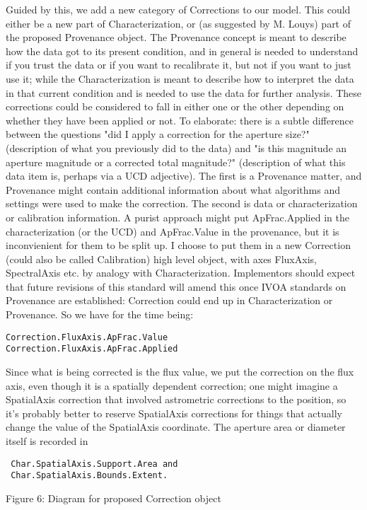 \documentclass[11pt]{article}
\begin{document}
{Guided by this, we add a new category of Corrections to our model. This
could either be a new part of Characterization, or (as suggested by M.
Louys) part of the proposed Provenance object. The Provenance concept is
meant to describe how the data got to its present condition, and in
general is needed  to understand if you trust the data or if you want to
recalibrate it, but not if you want to just use it; while the
Characterization is meant to describe how to interpret the data in that
current condition and is needed to use the data for further analysis.
These corrections could be considered to fall in either one or the other
depending on whether they have been applied or not. To elaborate: there
is a subtle difference between the questions "did I apply a correction
for the aperture size?"  (description of what you previously did to the
data) and "is this magnitude an aperture magnitude or a corrected total
magnitude?" (description of what this data item is, perhaps via a UCD
adjective). The first is a Provenance matter, and Provenance might
contain additional information about what algorithms and settings were
used to make the correction. The second is data or characterization or
calibration information. A purist approach might put ApFrac.Applied in the characterization (or the UCD)
and ApFrac.Value in the provenance, but it is inconvienient for them to be split up.
I choose to put them in a new Correction (could also be called Calibration)
high level object, with axes FluxAxis, SpectralAxis etc.
by analogy with Characterization. Implementors should
expect that future revisions of this standard will amend this once IVOA standards on Provenance
are established: Correction could end up in Characterization or Provenance. So we have for the time being:

\begin{verbatim}
Correction.FluxAxis.ApFrac.Value
Correction.FluxAxis.ApFrac.Applied
\end{verbatim}

Since what is being corrected is the flux value, we put the correction on the flux axis, even though
it is a spatially dependent correction; one might
imagine a SpatialAxis correction that involved astrometric corrections to the position, so it's probably better
to reserve SpatialAxis corrections for things that actually change the value of the SpatialAxis coordinate.
The aperture area or diameter itself is recorded in
\begin{verbatim}
 Char.SpatialAxis.Support.Area and
 Char.SpatialAxis.Bounds.Extent.
\end{verbatim}

\colorbox{iblue}{
}


\colorbox{iblue}{
\begin{minipage}{6.0in}
{Figure 6: Diagram for proposed Correction object}

\end{minipage}
}

}
\end{document}

